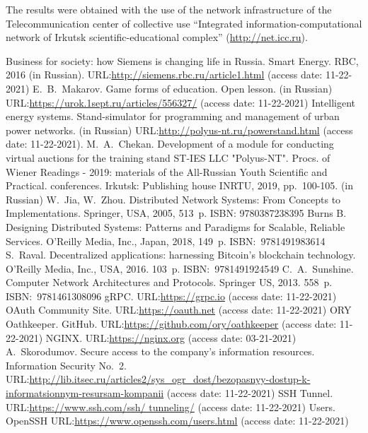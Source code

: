 \documentclass[
]{ceurart}
\begin{document}
The results were obtained with the use of the network infrastructure of the Telecommunication center of collective use ``Integrated information-computational network of Irkutsk scientific-educational complex'' (\url{http://net.icc.ru}).


\begin{thebibliography}{99}
    Business for society: how Siemens is changing life in Russia. Smart Energy. RBC, 2016 (in Russian). URL:\url{http://siemens.rbc.ru/article1.html} (access date: 11-22-2021)
    E.~B.~Makarov. Game forms of education. Open lesson. (in Russian) URL:\url{https://urok.1sept.ru/articles/556327/} (access date: 11-22-2021)
    Intelligent energy systems. Stand-simulator for programming and management of urban power networks. (in Russian) URL:\url{http://polyus-nt.ru/powerstand.html} (access date: 11-22-2021).
    M.~A.~Chekan. Development of a module for conducting virtual auctions for the training stand ST-IES LLC "Polyus-NT". Procs. of Wiener Readings - 2019: materials of the All-Russian Youth Scientific and Practical. conferences. Irkutsk: Publishing house INRTU, 2019,  pp.~100-105. (in Russian)
    W.~Jia, W.~Zhou. Distributed Network Systems: From Concepts to Implementations. Springer, USA, 2005, 513~p. ISBN: 9780387238395
    Burns B. Designing Distributed Systems: Patterns and Paradigms for Scalable, Reliable Services. O'Reilly Media, Inc., Japan, 2018, 149~p. ISBN:~9781491983614
    S.~Raval. Decentralized applications: harnessing Bitcoin's blockchain technology.  O'Reilly Media, Inc., USA, 2016. 103~p. ISBN:~9781491924549
    C.~A.~Sunshine. Computer Network Architectures and Protocols. Springer US, 2013. 558~p. ISBN:~9781461308096
    gRPC. URL:\url{https://grpc.io} (access date: 11-22-2021)
    OAuth Community Site. URL:\url{https://oauth.net} (access date: 11-22-2021)
    ORY Oathkeeper. GitHub. URL:\url{https://github.com/ory/oathkeeper} (access date: 11-22-2021)
    NGINX. URL:\url{https://nginx.org} (access date: 03-21-2021)
    A.~Skorodumov. Secure access to the company's information resources.  Information Security No.~2. URL:\url{http://lib.itsec.ru/articles2/sys_ogr_dost/bezopasnyy-dostup-k-informatsionnym-resursam-kompanii} (access date: 11-22-2021)
    SSH Tunnel. URL:\url{https://www.ssh.com/ssh/ tunneling/} (access date: 11-22-2021)
    Users. OpenSSH URL:\url{https://www.openssh.com/users.html} (access date: 11-22-2021)

\end{thebibliography}
\end{document}

